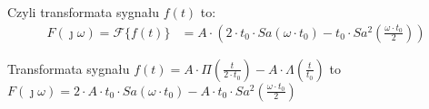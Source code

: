 \begin{task}
Czyli transformata sygnału $f(t)$ to:
\begin{align*}
F(\jmath \omega) = \mathcal F\{f(t)\} &= A \cdot \left( 2 \cdot t_{0} \cdot Sa\left(\omega \cdot t_{0}\right) - t_{0} \cdot Sa^2\left(\frac{\omega \cdot t_{0}}{2}\right)\right)
\end{align*}

Transformata sygnału $f(t) = A \cdot \Pi\left(\frac{t}{2\cdot t_{0}}\right) - A \cdot \Lambda(\frac{t}{t_{0}})$ to $F(\jmath \omega)=2 \cdot  A \cdot t_{0} \cdot Sa\left(\omega \cdot t_{0}\right) - A \cdot  t_{0} \cdot Sa^2\left(\frac{\omega \cdot t_{0}}{2}\right)$

\end{task}
